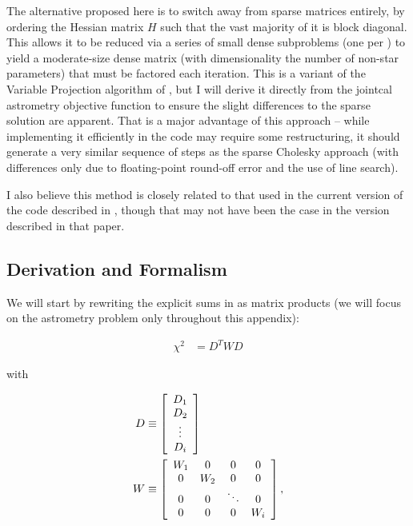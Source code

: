 The alternative proposed here is to switch away from sparse matrices entirely, by ordering the Hessian matrix $H$ such that the vast majority of it is block diagonal.
This allows it to be reduced via a series of small dense subproblems (one per ) to yield a moderate-size dense matrix (with dimensionality the number of non-star parameters) that must be factored each iteration.
This is a variant of the Variable Projection algorithm of \citet{1973SJNA...10..413G}, but I will derive it directly from the jointcal astrometry objective function  to ensure the slight differences to the sparse solution are apparent.
That is a major advantage of this approach -- while implementing it efficiently in the code may require some restructuring, it should generate a very similar sequence of steps as the sparse Cholesky approach (with differences only due to floating-point round-off error and the use of line search).

I also believe this method is closely related to that used in the current version of the code described in \citet{2017PASP..129g4503B}, though that may not have been the case in the version described in that paper.

\subsection{Derivation and Formalism}

We will start by rewriting the explicit sums in  as matrix products (we will focus on the astrometry problem only throughout this appendix):

\begin{align}
    \chi^{2} & = D^T W D
\end{align}

with

\begin{align}
    D & \equiv \left[
        \begin{array}{ c }
            D_1 \\
            D_2 \\
            \vdots \\
            D_i
        \end{array}
    \right] \\
    W & \equiv \left[
        \begin{array}{ c c c c }
               W_1 & 0 & 0 & 0 \\
            0 &    W_2 & 0 & 0 \\
            0 & 0 & \ddots & 0 \\
            0 & 0 & 0 &    W_i
        \end{array}
    \right],
\end{align}

